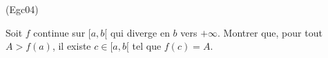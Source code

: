 \begin{tiny}(Egc04)\end{tiny} Soit $f$ continue sur $[a,b[$ qui diverge en $b$ vers $+\infty$. Montrer que, pour tout $A > f(a)$, il existe $c\in [a,b[$ tel que $f(c) = A$. 
